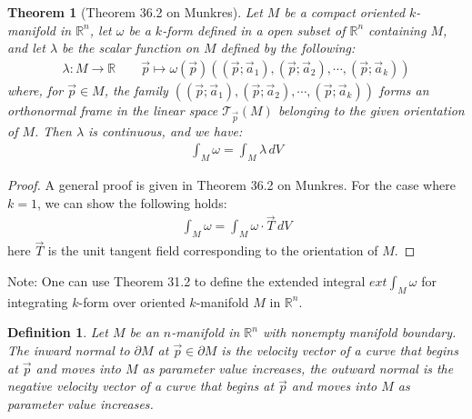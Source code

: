 \documentclass[11pt,oneside]{book}
\theoremstyle{break}
\theoremstyle{break}
\newtheorem{thm}{Theorem}[section]
\newtheorem{defn}{Definition}[corL]
\newcommand{\R}{\mathbb{R}}
\newcommand{\T}{\mathcal{T}}
\newcommand{\note}{\color{red}Note: \color{black}}
\begin{document}
\begin{thm}[Theorem 36.2 on Munkres]
Let $M$ be a compact oriented $k$-manifold in $\R^n$, let $\omega$ be a $k$-form defined in a open subset of $\R^n$ containing $M$, and let $\lambda$ be the scalar function on $M$ defined by the following:
\begin{align*}
\lambda:M \to \R \qquad \vec{p}\mapsto \omega(\vec{p})((\vec{p};\vec{a}_1),(\vec{p};\vec{a}_2),\cdots, (\vec{p};\vec{a}_k))
\end{align*}
where, for $\vec{p}\in M$, the family $((\vec{p};\vec{a}_1),(\vec{p};\vec{a}_2),\cdots, (\vec{p};\vec{a}_k))$ forms an orthonormal frame in the linear space $\T_{\vec{p}}(M)$ belonging to the given orientation of $M$. Then $\lambda$ is continuous, and we have:
\begin{align*}
\int_M \omega = \int_M \lambda \, dV
\end{align*}
\end{thm}
\begin{proof}
A general proof is given in Theorem 36.2 on Munkres. For the case where $k=1$, we can show the following holds:
\begin{align*}
\int_M \omega = \int_M \omega\cdot \vec{T} \, dV
\end{align*}
here $\vec{T}$ is the unit tangent field corresponding to the orientation of $M$.
\end{proof}

\note One can use Theorem 31.2 to define the extended integral $ext\int_M \omega$ for integrating $k$-form over oriented $k$-manifold $M$ in $\R^n$.


\begin{defn}
Let $M$ be an $n$-manifold in $\R^n$ with nonempty manifold boundary. The inward normal to $\partial M$ at $\vec{p}\in \partial M$ is the velocity vector of a curve that begins at $\vec{p}$ and moves into $M$ as parameter value increases, the outward normal is the negative velocity vector of a curve that begins at $\vec{p}$ and moves into $M$ as parameter value increases.
\end{defn}
\end{document}
